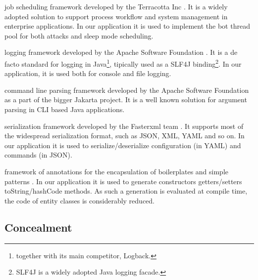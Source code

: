 \begin{description}
  \setlength\itemsep{1em}

  \item[QUARTZ] job scheduling framework developed by the Terracotta Inc \cite{quartz-scheduler}.
  It is a widely adopted solution to support process workflow and system management in enterprise applications.
  In our application it is used to implement the bot thread pool for both attacks and sleep mode scheduling.

  \item[LOG4J2] logging framework developed by the Apache Software Foundation \cite{log4j2}.
  It is a de facto standard for logging in Java\footnote{together with its main competitor, Logback.}, tipically used as a SLF4J binding\footnote{SLF4J is a widely adopted Java logging facade.}.
  In our application, it is used both for console and file logging.

  \item[COMMONS CLI] command line parsing framework developed by the Apache Software Foundation as a part of the bigger Jakarta project\cite{commons-cli}.
  It is a well known solution for argument parsing in CLI based Java applications.

  \item[JACKSON] serialization framework developed by the Fasterxml team \cite{jackson}.
  It supports most of the widespread serialization format, such as JSON, XML, YAML and so on.
  In our application it is used to serialize/deserialize configuration (in YAML) and commands (in JSON).

  \item[LOMBOK] framework of annotations for the encapsulation of boilerplates and simple patterns \cite{lombok}.
  In our application it is used to generate constructors getters/setters toString/hashCode methods. As such a generation is evaluated at compile time, the code of entity classes is considerably reduced.

  \item[BOOTSTRAP] \textcolor{green}{\lipsum[1]}

  \item[JQUERY] \textcolor{green}{\lipsum[1]}

\end{description}


\subsection{Concealment}
\label{sec:concealment}

